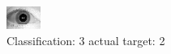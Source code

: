 \begin{figure}[h!]
\begin{center}
\includegraphics[width=0.60\columnwidth]{figures/ID1780_class_3_target_2.png}
\end{center}
\caption{ Classification: 3 actual target: 2}
\label{fig:ID1780_class_3_target_2}
\end{figure}
